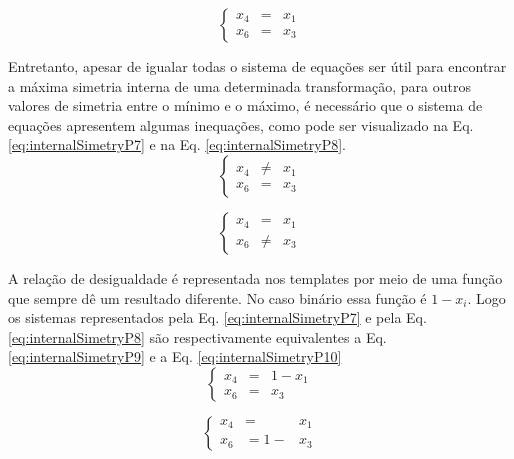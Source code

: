 \begin{equation}
\left\{\begin{matrix}
x_4 & = & x_1\\ 
x_6 & = & x_3
\end{matrix}\right.
\label{eq:internalSimetryP6}
\end{equation}

Entretanto, apesar de igualar todas o sistema de equações ser útil para encontrar a máxima simetria interna de uma determinada transformação, para outros valores de simetria entre o mínimo e o máximo, é necessário que o sistema de equações apresentem algumas inequações, como pode ser visualizado na Eq. \eqref{eq:internalSimetryP7} e na Eq. \eqref{eq:internalSimetryP8}.
\begin{equation}
\left\{\begin{matrix}
x_4 & \neq & x_1\\ 
x_6 & = & x_3
\end{matrix}\right.
\label{eq:internalSimetryP7}
\end{equation}

\begin{equation}
\left\{\begin{matrix}
x_4 & = & x_1\\ 
x_6 & \neq & x_3
\end{matrix}\right.
\label{eq:internalSimetryP8}
\end{equation}

A relação de desigualdade é representada nos templates por meio de uma função que sempre dê um resultado diferente. No caso binário essa função é $1 - x_i$. Logo os sistemas representados pela Eq. \eqref{eq:internalSimetryP7} e pela Eq. \eqref{eq:internalSimetryP8} são respectivamente equivalentes a Eq. \eqref{eq:internalSimetryP9} e a Eq. \eqref{eq:internalSimetryP10}
\begin{equation}
\left\{\begin{matrix}
x_4 & = & 1 - x_1\\ 
x_6 & = & x_3
\end{matrix}\right.
\label{eq:internalSimetryP9}
\end{equation}

\begin{equation}
\left\{\begin{matrix}
x_4 & = & x_1\\ 
x_6 & = 1 - & x_3
\end{matrix}\right.
\label{eq:internalSimetryP10}
\end{equation}

